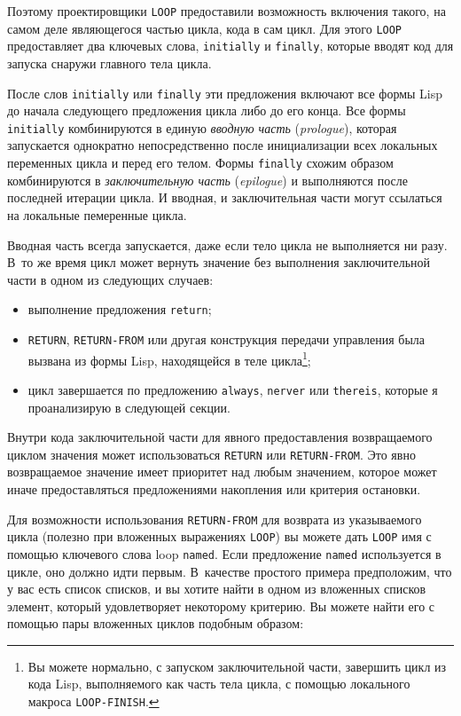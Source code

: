 Поэтому проектировщики \lstinline{LOOP} предоставили возможность включения такого, на самом
деле являющегося частью цикла, кода в сам цикл. Для этого \lstinline{LOOP} предоставляет два
ключевых слова, \lstinline{initially} и \lstinline{finally}, которые вводят код для запуска снаружи
главного тела цикла.

После слов \lstinline{initially} или \lstinline{finally} эти предложения включают все формы Lisp до
начала следующего предложения цикла либо до его конца. Все формы \lstinline{initially}
комбинируются в единую \textit{вводную часть} (\textit{prologue}), которая запускается
однократно непосредственно после инициализации всех локальных переменных цикла и перед его
телом. Формы \lstinline{finally} схожим образом комбинируются в \textit{заключительную часть}
(\textit{epilogue}) и выполняются после последней итерации цикла. И вводная, и
заключительная части могут ссылаться на локальные пемеренные цикла.

Вводная часть всегда запускается, даже если тело цикла не выполняется ни разу. В~то же
время цикл может вернуть значение без выполнения заключительной части в одном из следующих
случаев:
\begin{itemize}
\item выполнение предложения \lstinline{return};
\item \lstinline{RETURN}, \lstinline{RETURN-FROM} или другая конструкция передачи управления
  была вызвана из формы Lisp, находящейся в теле цикла\footnote{Вы можете нормально, с
    запуском заключительной части, завершить цикл из кода Lisp, вы\-пол\-няе\-мо\-го как часть
    тела цикла, с помощью локального макроса \lstinline{LOOP-FINISH}.};
\item цикл завершается по предложению \lstinline{always}, \lstinline{nerver} или \lstinline{thereis},
  которые я проанализирую в следующей секции.
\end{itemize}

Внутри кода заключительной части для явного предоставления возвращаемого циклом значения
может использоваться \lstinline{RETURN} или \lstinline{RETURN-FROM}. Это явно возвращаемое
значение имеет приоритет над любым значением, которое может иначе предоставляться
предложениями накопления или критерия остановки.

Для возможности использования \lstinline{RETURN-FROM} для возврата из указываемого цикла
(полезно при вложенных выражениях \lstinline{LOOP}) вы можете дать \lstinline{LOOP} имя с
помощью ключевого слова loop \lstinline{named}. Если предложение \lstinline{named} используется в
цикле, оно должно идти первым. В~качестве простого примера предположим, что у вас есть
список списков, и вы хотите найти в одном из вложенных списков элемент, который
удовлетворяет некоторому критерию. Вы можете найти его с помощью пары вложенных циклов
подобным образом:


